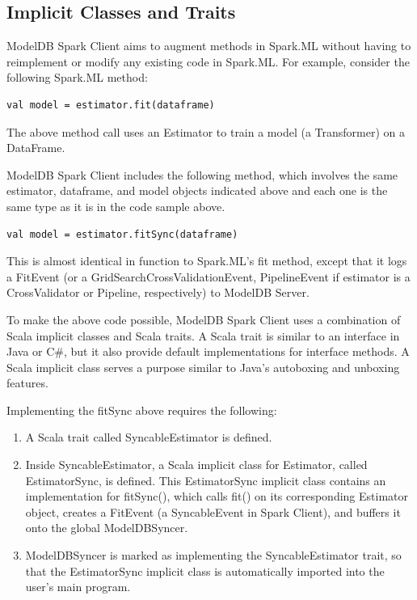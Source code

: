 \subsection{Implicit Classes and Traits}
ModelDB Spark Client aims to augment methods in Spark.ML without having to reimplement or
modify any existing code in Spark.ML. For example, consider the following Spark.ML method:

\begin{verbatim}
val model = estimator.fit(dataframe)
\end{verbatim}

The above method call uses an Estimator to train a model (a Transformer) on a DataFrame.


ModelDB Spark Client includes the following method, which involves the same estimator, dataframe,
and model objects indicated above and each one is the same type as it is in the code sample above.

\begin{verbatim}
val model = estimator.fitSync(dataframe)
\end{verbatim}

This is almost identical in function to Spark.ML's fit method, except that it logs a FitEvent
(or a GridSearchCrossValidationEvent, PipelineEvent if estimator is a CrossValidator or Pipeline,
respectively) to ModelDB Server.

To make the above code possible, ModelDB Spark Client uses a combination of Scala implicit classes
and Scala traits. A Scala trait is similar to an interface in Java or C\#, but it also provide default
implementations for interface methods. A Scala implicit class serves a purpose similar to Java's autoboxing
and unboxing features.

Implementing the fitSync above requires the following:

\begin{enumerate}
\item A Scala trait called SyncableEstimator is defined.
\item Inside SyncableEstimator, a Scala implicit class for Estimator, called EstimatorSync,
is defined. This EstimatorSync implicit class contains an implementation for fitSync(), which calls fit()
on its corresponding Estimator object, creates a FitEvent (a SyncableEvent in Spark Client), and buffers it
onto the global ModelDBSyncer.
\item ModelDBSyncer is marked as implementing the SyncableEstimator trait, so that the EstimatorSync implicit class
is automatically imported into the user's main program. 
\end{enumerate}

